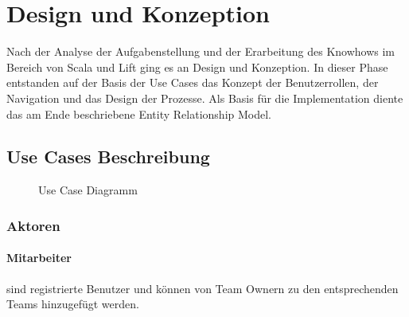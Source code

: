 \chapter{Design und Konzeption}\label{design-konzeption}
Nach der Analyse der Aufgabenstellung und der Erarbeitung des Knowhows im Bereich von Scala und Lift ging es an Design und Konzeption. In dieser Phase entstanden auf der Basis der Use Cases das Konzept der Benutzerrollen, der Navigation und das Design der Prozesse. Als Basis f\"ur die Implementation diente das am Ende beschriebene Entity Relationship Model.\section{Use Cases Beschreibung}\label{konzept:usecase}
 \begin{figure}[H]
  	\centering
 	\caption{Use Case Diagramm}
\end{figure}
\subsection{Aktoren}
\subsubsection{Mitarbeiter} sind registrierte Benutzer und k\"onnen von Team Ownern zu den entsprechenden Teams hinzugef\"ugt werden. 
